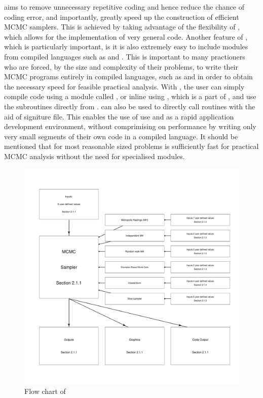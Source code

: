 \documentclass[article]{jss}
\begin{document}
 aims to remove unnecessary repetitive coding and hence
reduce the chance of coding error, and importantly, greatly speed up
the construction of efficient MCMC samplers. This is achieved by
taking advantage of the flexibility of , which allows
for the implementation of very general code. Another feature of
, which is particularly important, is it is also
extremely easy to include modules from compiled languages such as
 and . This is important to many
practioners who are forced, by the size and complexity of their
problems, to write their MCMC programs entirely in compiled languages,
such as  and  in order to obtain the
necessary speed for feasible practical analysis. With
, the user can simply compile  code
using a module called  \citet{F2PY}, or inline 
using , which is a part of  \citet{NumpyScipy},
and use the subroutines directly from . 
can also be used to directly call  routines with the aid
of  signiture file. This enables the use of use
 and  as a rapid application development
environment, without comprimising on performance by writing only very
small segments of their own code in a compiled language. It should be
mentioned that for most reasonable sized problems  is
sufficiently fast for practical MCMC analysis without the need for
specialised modules.

%
\begin{figure}[H]
  \begin{center}
\hspace*{-1cm}\includegraphics[width=18cm]{flowchart.pdf}    
  \end{center}
\caption{Flow chart of \label{fig:Flow-chart-ofPyMCMC}}

\end{figure}
\end{document}
